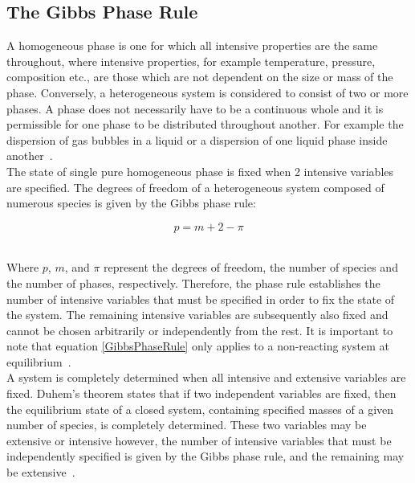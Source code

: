 \subsection{The Gibbs Phase Rule}

A homogeneous phase is one for which all intensive properties are the same throughout, where intensive properties, for example temperature, pressure, composition etc.,  are those which are not dependent on the size or mass of the phase. Conversely, a heterogeneous system is considered to consist of two or more phases. A phase does not necessarily have to be a continuous whole and it is permissible for one phase to be distributed throughout another. For example the dispersion of gas bubbles in a liquid or a dispersion of one liquid phase inside another~\cite{MolecularThermodynamicsOfFluidPhaseEquilibria, SmithNessAbbott}.\\

The state of single pure homogeneous phase is fixed when 2 intensive variables are specified. The degrees of freedom of a heterogeneous system composed of numerous species is given by the Gibbs phase rule:\

\begin{equation}
p = m + 2 - \pi \label{GibbsPhaseRule}
\end{equation}\


Where $p$, $m$, and $\pi$ represent the degrees of freedom, the number of species and the number of phases, respectively. Therefore, the phase rule establishes the number of intensive variables that must be specified in order to fix the state of the system. The remaining intensive variables are subsequently also fixed and cannot be chosen arbitrarily or independently from the rest. It is important to note that equation \ref{GibbsPhaseRule} only applies to a non-reacting system at equilibrium~\cite{ SmithNessAbbott}. \\

A system is completely determined when all intensive and extensive variables are fixed. Duhem's theorem states that if two independent variables are fixed, then the equilibrium state of a closed system, containing specified masses of a given number of species, is completely determined. These two variables may be extensive or intensive however, the number of intensive variables that must be independently specified is given by the Gibbs phase rule, and the remaining may be extensive~\cite{ SmithNessAbbott}.\


